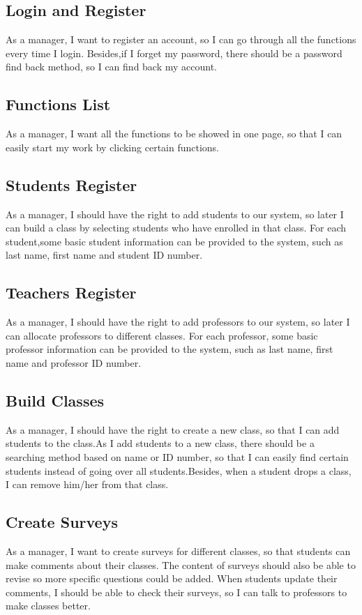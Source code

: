 
\subsection{Login and Register}
As a manager, I want to register an account, so I can go through all the functions every time I login. Besides,if I forget my password, there should be a password find back method, so I can find back my account.

\subsection{Functions List}
As a manager, I want all the functions to be showed in one page, so that I can easily start my work by clicking certain functions.

\subsection{Students Register}
As a manager, I should have the right to add students to our system, so later I can build a class by selecting students who have enrolled in that class. For each student,some basic student information can be provided to the system, such as last name, first name and student ID number.

\subsection{Teachers Register}
As a manager, I should have the right to add professors to our system, so later I can allocate professors to different classes. For each professor, some basic professor information can be provided to the system, such as last name, first name and professor ID number.

\subsection{Build Classes}
As a manager, I should have the right to create a new class, so that I can add students to the class.As I add students to a new class, there should be a searching method based on name or ID number, so that I can easily find certain students instead of going over all students.Besides, when a student drops a class, I can remove him/her from that class.

\subsection{Create Surveys}
As a manager, I want to create surveys for different classes, so that students can make comments about their classes. The content of surveys should also be able to revise so more specific questions could be added. When students update their comments, I should be able to check their surveys, so I can talk to professors to make classes better.